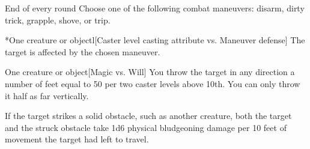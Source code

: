 \begin{spellheader}
    \spellrng{\rngmed}
\end{spellheader}
\begin{spelleffects}
    \begin{spelltrigger}{End of every round}
        \spellspecial Choose one of the following combat maneuvers: disarm, dirty trick, grapple, shove, or trip.
        \begin{spelltarget}*{One creature or object}l[Caster level \add casting attribute vs. Maneuver defense]
            \spellsuccess The target is affected by the chosen maneuver.
        \end{spelltarget}
    \end{spelltrigger}
\end{spelleffects}
\begin{spellfooter}
    
\end{spellfooter}

\begin{spellheader}
\end{spellheader}
\begin{spelleffects}
    \begin{spelltarget}{One creature or object}[Magic vs. Will]
        \spellsuccess You throw the target in any direction a number of feet equal to 50  per two caster levels above 10th. You can only throw it half as far vertically.

        If the target strikes a solid obstacle, such as another creature, both the target and the struck obstacle take 1d6 physical bludgeoning damage per 10 feet of movement the target had left to travel.
    \end{spelltarget}
\end{spelleffects}
\begin{spellfooter}
    
\end{spellfooter}

